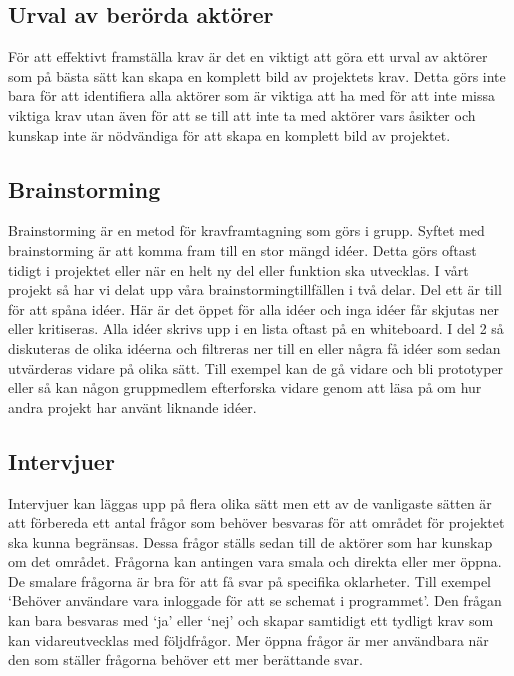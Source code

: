 \subsection{Urval av berörda aktörer}
För att effektivt framställa krav är det en viktigt att göra ett urval av aktörer som på bästa sätt kan skapa en komplett bild av projektets krav\cite{cs_choose_right}. Detta görs inte bara för att identifiera alla aktörer som är viktiga att ha med för att inte missa viktiga krav utan även för att se till att inte ta med aktörer vars åsikter och kunskap inte är nödvändiga för att skapa en komplett bild av projektet.

\subsection{Brainstorming}
Brainstorming är en metod för kravframtagning som görs i grupp. Syftet med brainstorming är att komma fram till en stor mängd idéer. Detta görs oftast tidigt i projektet eller när en helt ny del eller funktion ska utvecklas. I vårt projekt så har vi delat upp våra brainstormingtillfällen i två delar. Del ett är till för att spåna idéer. Här är det öppet för alla idéer och inga idéer får skjutas ner eller kritiseras. Alla idéer skrivs upp i en lista oftast på en whiteboard. I del 2 så diskuteras de olika idéerna och filtreras ner till en eller några få idéer som sedan utvärderas vidare på olika sätt. Till exempel kan de gå vidare och bli prototyper eller så kan någon gruppmedlem efterforska vidare genom att läsa på om hur andra projekt har använt liknande idéer. 

\subsection{Intervjuer}\label{sec:ch-intervju}
Intervjuer kan läggas upp på flera olika sätt men ett av de vanligaste sätten är att förbereda ett antal frågor som behöver besvaras för att området för projektet ska kunna begränsas. Dessa frågor ställs sedan till de aktörer som har kunskap om det området. Frågorna kan antingen vara smala och direkta eller mer öppna. De smalare frågorna är bra för att få svar på specifika oklarheter. Till exempel ‘Behöver användare vara inloggade för att se schemat i programmet’. Den frågan kan bara besvaras med ‘ja’ eller ‘nej’ och skapar samtidigt ett tydligt krav som kan vidareutvecklas med följdfrågor. Mer öppna frågor är mer användbara när den som ställer frågorna behöver ett mer berättande svar.

